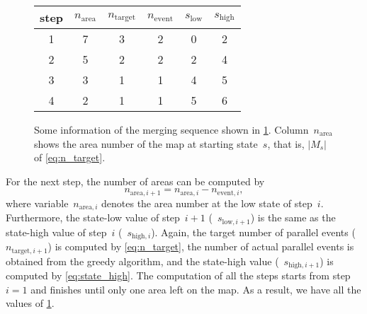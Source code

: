 \documentclass[]{interact}
\begin{document}
\begin{figure}[h]
%
%
%
\captionsetup*{type=table} %
\caption{Some information of the merging sequence shown in \tabl\ref{tbl:sequence_greedy}.
Column~$n_\mathrm{area}$ shows the area number of the map at starting state~$s$,
that is, $|M_s|$ of \eq\ref{eq:n_target}.
}
\label{tbl:sequence_greedy}
\centering
\begin{tabular}{cccccc}
\toprule
step & $n_\mathrm{area}$ & $n_\mathrm{target}$ 
& $n_\mathrm{event}$ & $s_\mathrm{low}$ & $s_\mathrm{high}$ \\ \midrule
1        & 7      & 3        & 2        & 0      & 2      \\
2        & 5      & 2        & 2        & 2      & 4      \\
3        & 3      & 1        & 1        & 4      & 5      \\
4        & 2      & 1        & 1        & 5      & 6      \\
\bottomrule
\end{tabular}
\end{figure}

For the next step, the number of areas can be computed by
$$
n_{\mathrm{area},i+1} = n_{\mathrm{area},i} - n_{\mathrm{event},i},
$$
where variable~$n_{\mathrm{area},i}$ denotes the area number 
at the low state of step~$i$.
Furthermore, the state-low value of step~$i+1$ (\ie~$s_{\mathrm{low},i+1}$) 
is the same as the state-high value of step~$i$ (\ie~$s_{\mathrm{high},i}$).
Again, the target number of parallel events (\ie~$n_{\mathrm{target},i+1}$)
is computed by \eq\ref{eq:n_target},
the number of actual parallel events is obtained from the greedy algorithm,
and the state-high value (\ie~$s_{\mathrm{high},i+1}$) 
is computed by \eq\ref{eq:state_high}.
The computation of all the steps starts from step~$i=1$ and 
finishes until only one area left on the map.
As a result, we have all the values of \tabl\ref{tbl:sequence_greedy}.
\end{document}
